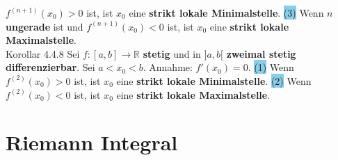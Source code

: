 \documentclass[landscape, 10pt]{article}
\newcommand{\R}{\mathbb{R}}
\begin{document}
\begin{multicols}{3}
                     \textcolor{NavyBlue}{$f^{(n+1)}(x_0)>0$} ist, ist 
                     \textcolor{NavyBlue}{$x_0$} 
                     eine \textbf{strikt lokale Minimalstelle}. 
                     \colorbox{SkyBlue}{(3)} Wenn \textcolor{NavyBlue}{$n$} 
                     \textbf{ungerade} 
                     ist und \textcolor{NavyBlue}{$f^{(n+1)}(x_0)<0$} ist, ist 
                     \textcolor{NavyBlue}{$x_0$} eine 
                     \textbf{strikt lokale Maximalstelle}. \\
              \colorbox{BurntOrange}{Korollar 4.4.8} 
                     Sei \textcolor{NavyBlue}{$f:[a,b]\longrightarrow\R$} 
                     \textbf{stetig} und in \textcolor{NavyBlue}{$]a,b[$}
                     \textbf{zweimal stetig differenzierbar}. Sei 
                     \textcolor{NavyBlue}{$a<x_0<b$}. 
                     Annahme: \textcolor{NavyBlue}{$f'(x_0)=0$}.
                     \colorbox{SkyBlue}{(1)} Wenn \textcolor{NavyBlue}{$f^{(2)}(x_0)>0$} ist, ist 
                     \textcolor{NavyBlue}{$x_0$}
                     eine \textbf{strikt lokale Minimalstelle}. 
                     \colorbox{SkyBlue}{(2)} Wenn \textcolor{NavyBlue}{$f^{(2)}(x_0)<0$} ist, ist
                     \textcolor{NavyBlue}{$x_0$}
                     eine \textbf{strikt lokale Maximalstelle}.

\section{Riemann Integral}

\end{multicols}
\end{document}
